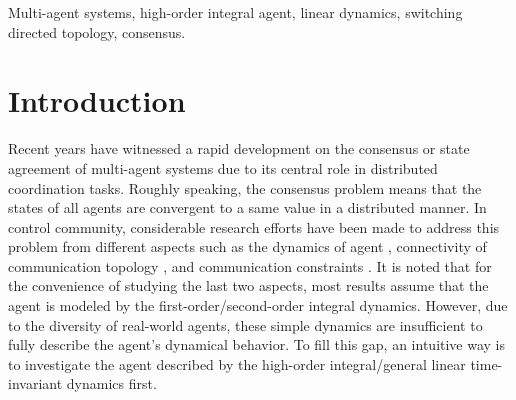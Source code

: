 \documentclass[12pt,draftcls,onecolumn]{IEEEtran}
\begin{document}
\begin{IEEEkeywords}
Multi-agent systems, high-order integral agent, linear dynamics, switching directed topology, consensus.
\end{IEEEkeywords}

\IEEEpeerreviewmaketitle


\section{Introduction}
Recent years have witnessed a rapid development on the consensus or state agreement of multi-agent systems due to its central
role in distributed coordination tasks. Roughly speaking, the consensus problem means that the states of all agents are convergent to a same value in a distributed manner. In control community, considerable research efforts have been made to address this problem from different aspects such as the dynamics of agent \cite{Zhao13TSMCB, Cheng09TSMCB}, connectivity of communication topology \cite{Chen13TSMCB}, and communication constraints \cite{Zhong12TSMCB, Meng11TSMCB}. It is noted that for the convenience of studying the last two aspects, most results assume that the agent is modeled by the first-order/second-order integral dynamics. However, due to the diversity of real-world agents, these simple dynamics are insufficient to fully describe the agent's dynamical behavior. To fill this gap, an intuitive way is to investigate the agent described by the high-order integral/general linear time-invariant dynamics first.
\end{document}
